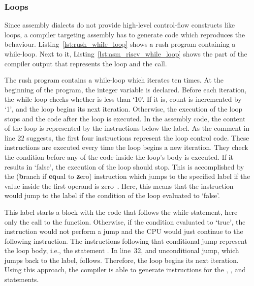 \subsubsection{Loops}

Since assembly dialects do not provide high-level control-flow constructs like loops,
a compiler targeting assembly has to generate code which reproduces the behaviour.
Listing~\ref{lst:rush_while_loop} shows a rush program containing a while-loop.
Next to it, Listing~\ref{lst:asm_riscv_while_loop} shows the part of the compiler output that represents the loop and the  call.

\noindent
\begin{minipage}{.45\textwidth}
	\centering
\end{minipage}%
\hfill
\begin{minipage}{.45\textwidth}
	\centering
	\vspace{.1cm}
\end{minipage}

The rush program contains a while-loop which iterates ten times.
At the beginning of the program, the integer variable  is declared.
Before each iteration, the while-loop checks whether  is less than `10'.
If it is, count is incremented by `1', and the loop begins its next iteration.
Otherwise, the execution of the loop stops and the code after the loop is executed.
In the assembly code, the content of the loop is represented by the instructions below the  label.
As the comment in line 22 suggests, the first four instructions represent the loop control code.
These instructions are executed every time the loop begins a new iteration.
They check the condition before any of the code inside the loop's body is executed.
If it results in `false', the execution of the loop should stop.
This is accomplished by the  (\textbf{b}ranch if \textbf{eq}ual to \textbf{z}ero) instruction which jumps to the specified label if the value inside the first operand is zero~\cite[p.~105]{Waterman2019}.
Here, this means that the instruction would jump to the  label if the condition of the loop evaluated to `false'.

This label starts a block with the code that follows the while-statement, here only the call to the  function.
Otherwise, if the condition evaluated to `true', the  instruction would not perform a jump and the CPU would just continue to the following instruction.
The instructions following that conditional jump represent the loop body, i.e., the statement .
In line~32, and unconditional jump, which jumps back to the  label, follows.
Therefore, the loop begins its next iteration.
Using this approach, the compiler is able to generate instructions for the , , and  statements.
